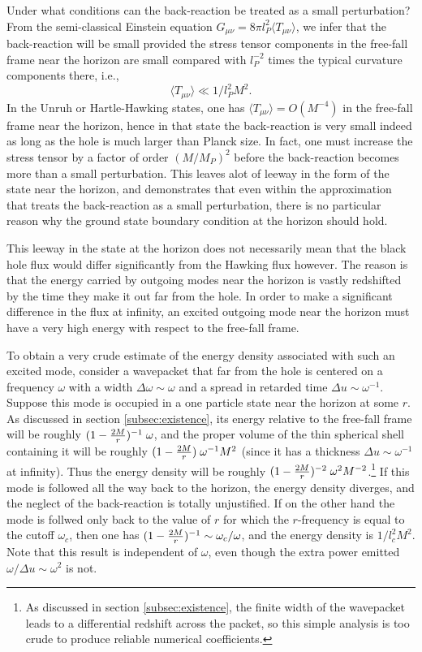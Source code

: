 \documentclass[12pt]{article}
\def\o{\omega}
\def\la{\langle}
\def\ra{\rangle}
\begin{document}
Under what conditions can the back-reaction be treated
as a small perturbation? From the semi-classical
Einstein equation $G_{\mu\nu}=8\pi l_P^2 \la
T_{\mu\nu}\ra$, we infer that the back-reaction will
be small provided the stress tensor components
in the free-fall frame near the horizon are small
compared with $l_P^{-2}$ times the typical curvature
components there, i.e.,
\begin{equation}
\la T_{\mu\nu}\ra\ll 1/l_P^2 M^2.
\label{inequality}
\end{equation}
In the Unruh or Hartle-Hawking states, one has $\la
T_{\mu\nu}\ra=O(M^{-4})$ in the free-fall frame near the
horizon, hence in that state the back-reaction is very small indeed
as long as the hole is much larger than Planck size.
In fact, one must increase the stress tensor by a
factor of order $(M/M_P)^2$ before the back-reaction
becomes more than a small perturbation. This leaves
alot of leeway in the form of the state near the
horizon, and demonstrates that even within the
approximation that treats the back-reaction as a small
perturbation, there is no particular reason why the
ground state boundary condition at the horizon should
hold.

This leeway in the state at the horizon does not
necessarily mean that the black hole flux
would differ significantly from the Hawking flux
however. The
reason is that the energy carried by outgoing modes
near the horizon is vastly redshifted by the time they
make it out far from the hole. In order to make a
significant difference in the flux at infinity, an
excited outgoing mode near the horizon must have a very
high energy with respect to the free-fall frame.

To obtain a very crude estimate of the energy density
associated with such an excited mode, consider a wavepacket
that far from the hole is centered on a frequency $\o$
with a width $\Delta\o\sim\o$ and a spread in
retarded time $\Delta u\sim\o^{-1}$.
Suppose this mode is occupied in a one
particle state near the
horizon at some $r$. As discussed in section
\ref{subsec:existence},
its energy relative to the free-fall frame
will be roughly $(1-{2M\over r})^{-1}\; \o$, and the
proper volume of the thin spherical shell containing it will
be roughly $(1-{2M\over r})\; \o^{-1}M^2$ (since it has a thickness
$\Delta u\sim \o^{-1}$ at infinity).
Thus the energy density will be
roughly $(1-{2M\over r})^{-2}\; \o^2 M^{-2}$.\footnote{As discussed
in section \ref{subsec:existence}, the finite width of the
wavepacket leads to a differential redshift across the
packet, so this simple analysis is too crude to produce
reliable numerical coefficients.}
If this mode is followed all the way back to the
horizon, the energy density diverges, and the neglect
of the back-reaction is totally unjustified. If on the
other hand the mode is follwed only back to the value
of $r$ for which the $r$-frequency is equal to the cutoff
$\o_c$, then one has $(1-{2M\over r})^{-1}\sim \o_c/\o$,
and the energy density is $1/l_c^2M^2$.
Note that this result is
independent of $\o$, even though the extra power emitted
$\o/\Delta u\sim\o^2$ is not.
\end{document}

